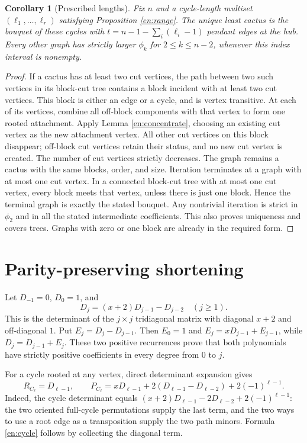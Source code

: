 \documentclass[12pt]{amsart}
\newtheorem{cor}[thm]{Corollary}
\theoremstyle{definition}
\theoremstyle{remark}
\numberwithin{equation}{section}
\begin{document}
\begin{cor}[Prescribed lengths]\label{en:lengths}
Fix $n$ and a cycle-length multiset $(\ell_1,\ldots,\ell_r)$ satisfying
Proposition \ref{en:range}. The unique least cactus is the bouquet of
these cycles with $t=n-1-\sum_i(\ell_i-1)$ pendant edges at the hub.
Every other graph has strictly larger $\phi_k$ for $2\le k\le n-2$,
whenever this index interval is nonempty.
\end{cor}
\begin{proof}
If a cactus has at least two cut vertices, the path between two such
vertices in its block-cut tree contains a block incident with at least
two cut vertices. This block is either an edge or a cycle, and is
vertex transitive. At each of its vertices, combine all off-block
components with that vertex to form one rooted attachment. Apply
Lemma \ref{en:concentrate}, choosing an existing cut vertex as the new
attachment vertex. All other cut vertices on this block disappear;
off-block cut vertices retain their status, and no new cut vertex is
created. The number of cut vertices strictly decreases. The graph
remains a cactus with the same blocks, order, and size.
Iteration terminates at a graph with at most one cut vertex. In a
connected block-cut tree with at most one cut vertex, every block meets
that vertex, unless there is just one block. Hence the terminal graph
is exactly the stated bouquet. Any nontrivial iteration is strict in
$\phi_2$ and in all the stated intermediate coefficients. This also
proves uniqueness and covers trees. Graphs with zero or one block are
already in the required form.
\end{proof}

\section{Parity-preserving shortening}
Let $D_{-1}=0$, $D_0=1$, and
\begin{equation}\label{en:D}
 D_j=(x+2)D_{j-1}-D_{j-2}\quad(j\ge1).
\end{equation}
This is the determinant of the $j\times j$ tridiagonal matrix with
diagonal $x+2$ and off-diagonal $1$. Put $E_j=D_j-D_{j-1}$.
Then $E_0=1$ and $E_j=xD_{j-1}+E_{j-1}$, while $D_j=D_{j-1}+E_j$.
These two positive recurrences prove that both polynomials have strictly
positive coefficients in every degree from $0$ to $j$.

For a cycle rooted at any vertex, direct determinant expansion gives
\begin{equation}\label{en:cycle}
 R_{C_\ell}=D_{\ell-1},\qquad
 P_{C_\ell}=xD_{\ell-1}
       +2(D_{\ell-1}-D_{\ell-2})+2(-1)^{\ell-1}.
\end{equation}
Indeed, the cycle determinant equals
$(x+2)D_{\ell-1}-2D_{\ell-2}+2(-1)^{\ell-1}$:
the two oriented full-cycle permutations supply the last term, and
the two ways to use a root edge as a transposition supply the two path
minors. Formula \eqref{en:cycle} follows by collecting the diagonal term.
\end{document}
